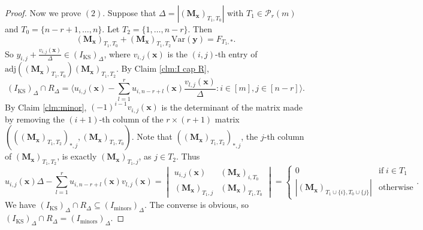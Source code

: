 \documentclass[a4paper, 11pt]{amsart}
\newcommand{\mc}[1]{\mathcal{#1}}
\newcommand{\ideala}[1]{\langle{#1}\rangle}
\newcommand{\td}[1]{\bm{#1}}
\newcommand{\tx}[1]{\text{#1}}
\theoremstyle{definition}
\theoremstyle{definition}
\begin{document}
\begin{proof}
		Now we prove $(2)$. Suppose that $\Delta=|(\td{M_x})_{T_1,T_0}|$ with $T_1\in\mc{P}_r(m)$ and $T_0=\{n-r+1,\dots,n\}$. Let $T_2=\{1,\dots,n-r\}$. Then
		\begin{equation*}
			(\td{M_x})_{T_1,T_0}+(\td{M_x})_{T_1,T_2}
			\tx{Var}(\td{y})=F_{T_1,*}.
		\end{equation*}
		So $y_{i,j}+\frac{v_{i,j}(\td{x})}{\Delta}\in (I_{\tx{KS}})_{\Delta}$, where $v_{i,j}(\td{x})$ is the $(i,j)$-th entry of $\tx{adj}((\td{M_x})_{T_1,T_0})(\td{M_x})_{T_1,T_2}$. By Claim \ref{clm:I cap R},
		\begin{equation*}
			(I_{\tx{KS}})_{\Delta}\cap R_\Delta=\ideala{u_{i,j}(\td{x})-\sum^r_{l=1}u_{i,n-r+l}(\td{x})\frac{v_{l,j}(\td{x})}{\Delta}:i\in[m],j\in[n-r]}.	
		\end{equation*}
		By Claim \ref{clm:minor}, $(-1)^{i-1}v_{i,j}(\td{x})$ is the determinant of the matrix made by removing the $(i+1)$-th column of the $r\times(r+1)$ matrix $(
		((\td{M_x})_{T_1,T_2})_{*,j},(\td{M_x})_{T_1,T_0})$. Note that $((\td{M_x})_{T_1,T_2})_{*,j}$, the $j$-th column of $(\td{M_x})_{T_1,T_2}$, is exactly $(\td{M_x})_{T_1,j}$, as $j\in T_2$. Thus
		\begin{equation*}
			u_{i,j}(\td{x})\Delta-\sum^r_{l=1}u_{i,n-r+l}(\td{x})v_{l,j}(\td{x})=
			\begin{vmatrix}
				u_{i,j}(\td{x})&(\td{M_x})_{i,T_0}\\
				(\td{M_x})_{T_1,j}&(\td{M_x})_{T_1,T_0}
			\end{vmatrix}=\begin{cases}
				0&\tx{if}\;i\in T_1\\
				|(\td{M_x})_{T_1\cup\{i\},T_0\cup\{j\}}|&\tx{otherwise}
			\end{cases}.
		\end{equation*}
		We have $(I_{\tx{KS}})_{\Delta}\cap R_{\Delta}\subseteq (I_{\tx{minors}})_\Delta$. The converse is obvious, so $(I_{\tx{KS}})_{\Delta}\cap R_{\Delta}=(I_{\tx{minors}})_\Delta$.
	\end{proof}
	
\end{document}
